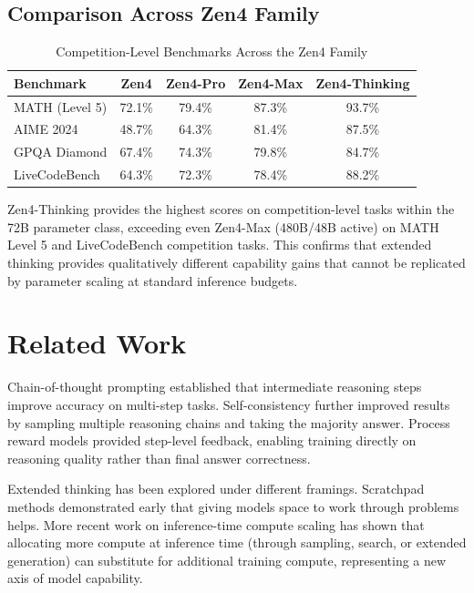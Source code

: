 \documentclass[11pt,a4paper]{article}
\begin{document}
\subsection{Comparison Across Zen4 Family}

\begin{table}[H]
\centering
\begin{tabular}{lcccc}
\toprule
\textbf{Benchmark} & \textbf{Zen4} & \textbf{Zen4-Pro} & \textbf{Zen4-Max} & \textbf{Zen4-Thinking} \\
\midrule
MATH (Level 5)   & 72.1\% & 79.4\% & 87.3\% & 93.7\% \\
AIME 2024        & 48.7\% & 64.3\% & 81.4\% & 87.5\% \\
GPQA Diamond     & 67.4\% & 74.3\% & 79.8\% & 84.7\% \\
LiveCodeBench    & 64.3\% & 72.3\% & 78.4\% & 88.2\% \\
\bottomrule
\end{tabular}
\caption{Competition-Level Benchmarks Across the Zen4 Family}
\end{table}

Zen4-Thinking provides the highest scores on competition-level tasks within the 72B
parameter class, exceeding even Zen4-Max (480B/48B active) on MATH Level 5 and
LiveCodeBench competition tasks. This confirms that extended thinking provides
qualitatively different capability gains that cannot be replicated by parameter scaling
at standard inference budgets.

\section{Related Work}

Chain-of-thought prompting \cite{wei2022chain} established that intermediate reasoning
steps improve accuracy on multi-step tasks. Self-consistency \cite{wang2022selfconsistency}
further improved results by sampling multiple reasoning chains and taking the majority
answer. Process reward models \cite{lightman2023let} provided step-level feedback, enabling
training directly on reasoning quality rather than final answer correctness.

Extended thinking has been explored under different framings. Scratchpad methods
\cite{nye2021show} demonstrated early that giving models space to work through problems
helps. More recent work on inference-time compute scaling \cite{snell2024scaling} has
shown that allocating more compute at inference time (through sampling, search, or extended
generation) can substitute for additional training compute, representing a new axis of
model capability.
\end{document}
